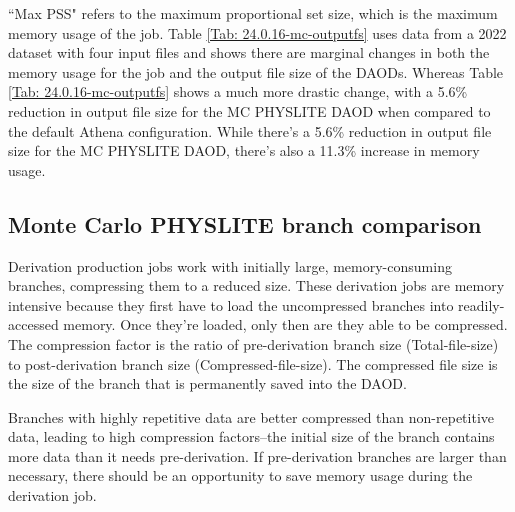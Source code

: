 ``Max PSS" refers to the maximum proportional set size, which is the maximum memory usage of the job.
Table \ref{Tab: 24.0.16-mc-outputfs} uses data from a 2022 dataset with four input files and shows there are marginal changes in both the memory usage for the job and the output file size of the DAODs. 
Whereas Table \ref{Tab: 24.0.16-mc-outputfs} shows a much more drastic change, with a 5.6\% reduction in output file size for the MC PHYSLITE DAOD when compared to the default Athena configuration.
While there's a 5.6\% reduction in output file size for the MC PHYSLITE DAOD, there's also a 11.3\% increase in memory usage. 


\subsection{Monte Carlo PHYSLITE branch comparison}
\label{sec:DAODProd_Results_Monte}

Derivation production jobs work with initially large, memory-consuming branches, compressing them to a reduced size. 
These derivation jobs are memory intensive because they first have to load the uncompressed branches into readily-accessed memory. 
Once they're loaded, only then are they able to be compressed. 
The compression factor is the ratio of pre-derivation branch size (Total-file-size) to post-derivation branch size (Compressed-file-size). 
The compressed file size is the size of the branch that is permanently saved into the DAOD.  

Branches with highly repetitive data are better compressed than non-repetitive data, leading to high compression factors--the initial size of the branch contains more data than it needs pre-derivation. 
If pre-derivation branches are larger than necessary, there should be an opportunity to save memory usage during the derivation job. 


